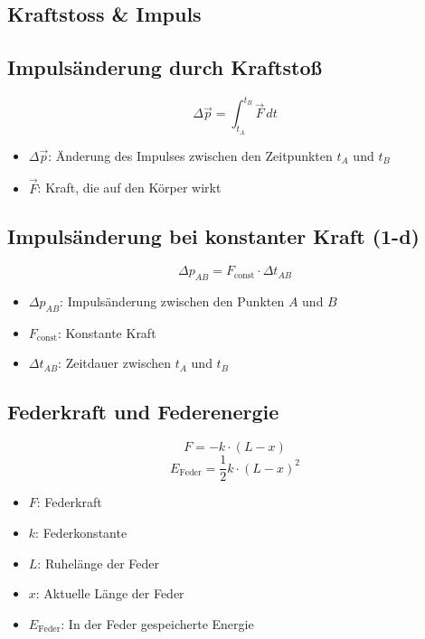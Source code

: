 \documentclass[a4paper, 8pt]{extarticle}
\begin{document}
\begin{landscape}
\begin{multicols*}{3}
\section{Kraftstoss & Impuls}

\subsection{Impulsänderung durch Kraftstoß}
\[
\Delta \vec{p} = \int_{t_A}^{t_B} \vec{F} \, dt
\]
{\footnotesize
\begin{itemize}
    \item \( \Delta \vec{p} \): Änderung des Impulses zwischen den Zeitpunkten \( t_A \) und \( t_B \)
    \item \( \vec{F} \): Kraft, die auf den Körper wirkt
\end{itemize}
}

\subsection{Impulsänderung bei konstanter Kraft (1-d)}
\[
\Delta p_{AB} = F_{\text{const}} \cdot \Delta t_{AB}
\]
{\footnotesize
\begin{itemize}
    \item \( \Delta p_{AB} \): Impulsänderung zwischen den Punkten \( A \) und \( B \)
    \item \( F_{\text{const}} \): Konstante Kraft
    \item \( \Delta t_{AB} \): Zeitdauer zwischen \( t_A \) und \( t_B \)
\end{itemize}
}

\subsection{Federkraft und Federenergie}
\[
F = -k \cdot (L - x)
\]
\[
E_{\text{Feder}} = \frac{1}{2} k \cdot (L - x)^2
\]
{\footnotesize
\begin{itemize}
    \item \( F \): Federkraft
    \item \( k \): Federkonstante
    \item \( L \): Ruhelänge der Feder
    \item \( x \): Aktuelle Länge der Feder
    \item \( E_{\text{Feder}} \): In der Feder gespeicherte Energie
\end{itemize}
}


\end{multicols*}
\end{landscape}
\end{document}
